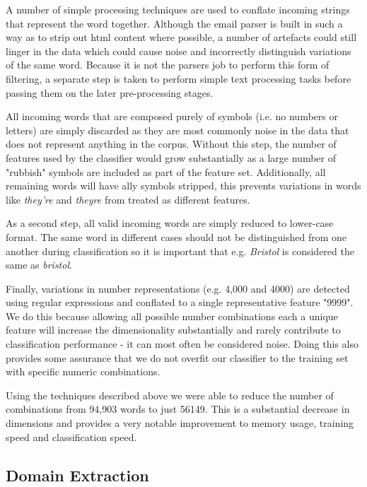 A number of simple processing techniques are used to conflate incoming strings that represent the word together. Although the email parser is built in such a way as to strip out html content where possible, a number of artefacts could still linger in the data which could cause noise and incorrectly distinguish variations of the same word. Because it is not the parsers job to perform this form of filtering, a separate step is taken to perform simple text processing tasks before passing them on the later pre-processing stages.

All incoming words that are composed purely of symbols (i.e. no numbers or letters) are simply discarded as they are most commonly noise in the data that does not represent anything in the corpus. Without this step, the number of features used by the classifier would grow substantially as a large number of "rubbish" symbols are included as part of the feature set. Additionally, all remaining words will have ally symbols stripped, this prevents variations in words like {\it they're} and {\it theyre} from treated as different features.

As a second step, all valid incoming words are simply reduced to lower-case format. The same word in different cases should not be distinguished from one another during classification so it is important that e.g. {\it Bristol} is considered the same as {\it bristol}.

Finally, variations in number representations (e.g. 4,000 and 4000) are detected using regular expressions and conflated to a single representative feature "9999". We do this because allowing all possible number combinations each a unique feature will increase the dimensionality substantially and rarely contribute to classification performance - it can most often be considered noise. Doing this also provides some assurance that we do not overfit our classifier to the training set with specific numeric combinations.

Using the techniques described above we were able to reduce the number of  combinations from 94,903 words to just 56149. This is a substantial decrease in dimensions and provides a very notable improvement to memory usage, training speed and classification speed. 


\subsection{Domain Extraction}



